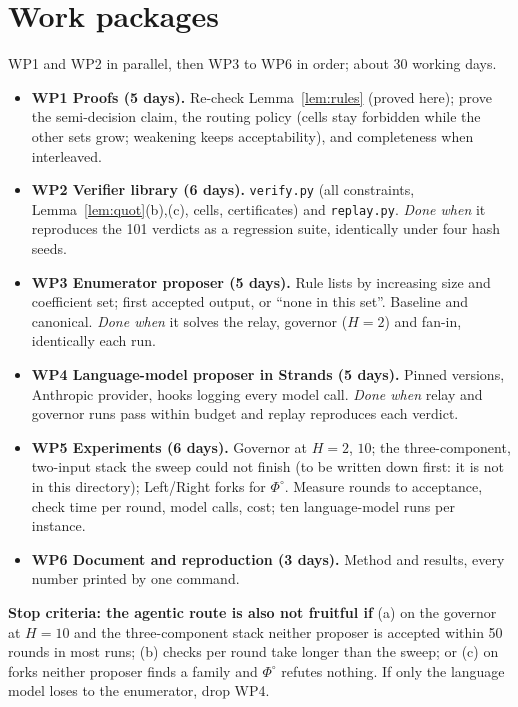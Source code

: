 \documentclass[10pt]{article}
\theoremstyle{tplain}\newtheorem{theorem}{Theorem}\newtheorem{lemma}[theorem]{Lemma}\newtheorem{proposition}[theorem]{Proposition}\newtheorem{corollary}[theorem]{Corollary}\newtheorem{claim}[theorem]{Claim}
\theoremstyle{tdef}\newtheorem{definition}[theorem]{Definition}
\begin{document}
\section{Work packages}
WP1 and WP2 in parallel, then WP3 to WP6 in order; about 30 working days.
\begin{itemize}
\item \textbf{WP1 Proofs (5 days).} Re-check Lemma~\ref{lem:rules} (proved here); prove the semi-decision claim, the routing policy (cells stay forbidden while the other sets grow; weakening keeps acceptability), and completeness when interleaved.
\item \textbf{WP2 Verifier library (6 days).} \texttt{verify.py} (all constraints, Lemma~\ref{lem:quot}(b),(c), cells, certificates) and \texttt{replay.py}. \emph{Done when} it reproduces the 101 verdicts as a regression suite, identically under four hash seeds.
\item \textbf{WP3 Enumerator proposer (5 days).} Rule lists by increasing size and coefficient set; first accepted output, or ``none in this set''. Baseline and canonical. \emph{Done when} it solves the relay, governor ($H=2$) and fan-in, identically each run.
\item \textbf{WP4 Language-model proposer in Strands (5 days).} Pinned versions, Anthropic provider, hooks logging every model call. \emph{Done when} relay and governor runs pass within budget and replay reproduces each verdict.
\item \textbf{WP5 Experiments (6 days).} Governor at $H=2$, $10$; the three-component, two-input stack the sweep could not finish (to be written down first: it is not in this directory); Left/Right forks for $\Phi^\circ$. Measure rounds to acceptance, check time per round, model calls, cost; ten language-model runs per instance.
\item \textbf{WP6 Document and reproduction (3 days).} Method and results, every number printed by one command.
\end{itemize}
\textbf{Stop criteria: the agentic route is also not fruitful if} (a) on the governor at $H=10$ and the three-component stack neither proposer is accepted within 50 rounds in most runs; (b) checks per round take longer than the sweep; or (c) on forks neither proposer finds a family and $\Phi^\circ$ refutes nothing. If only the language model loses to the enumerator, drop WP4.
\end{document}
